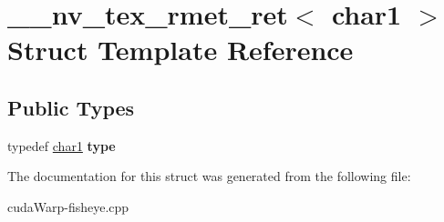 \hypertarget{struct____nv__tex__rmet__ret_3_01char1_01_4}{}\section{\+\_\+\+\_\+nv\+\_\+tex\+\_\+rmet\+\_\+ret$<$ char1 $>$ Struct Template Reference}
\label{struct____nv__tex__rmet__ret_3_01char1_01_4}
\subsection*{Public Types}
\begin{DoxyCompactItemize}
\item 
typedef \hyperlink{structchar1}{char1} {\bfseries type}\hypertarget{struct____nv__tex__rmet__ret_3_01char1_01_4_a1958009760194a37a20a0ba84fa195dd}{}\label{struct____nv__tex__rmet__ret_3_01char1_01_4_a1958009760194a37a20a0ba84fa195dd}

\end{DoxyCompactItemize}


The documentation for this struct was generated from the following file\+:\begin{DoxyCompactItemize}
\item 
cuda\+Warp-\/fisheye.\+cpp\end{DoxyCompactItemize}

